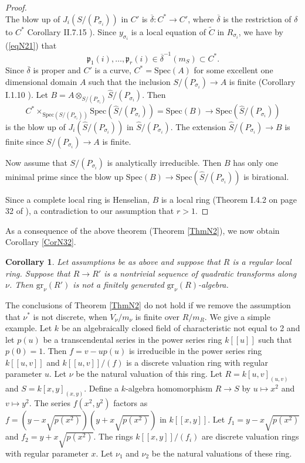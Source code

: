 \documentclass[11pt]{amsart}
\newtheorem{Corollary}[Theorem]{Corollary}
\begin{document}
\begin{proof}
$$ $$
 The blow up of $J_i(S/(P_{\sigma_i}))$ in $C'$ is $\overline\delta:C^*\rightarrow C'$, where $\overline\delta$ is the restriction of $\delta$ to $C^*$  Corollary II.7.15 \cite{H}). Since $y_{\sigma_i}$ is a local equation of $\tilde C$ in $R_{\sigma_i}$, we have by (\ref{eqN21})  that 
 $$
 \mathfrak p_1(i),\ldots,\mathfrak p_r(i)\in \overline\delta^{-1}(m_S)\subset C^*.
 $$
 Since $\overline\delta$ is proper and $C'$ is a curve, $C^*=\mbox{Spec}(A)$ for some excellent one dimensional  domain $A$ such that the inclusion $S/(P_{\sigma_i})\rightarrow A$ is finite (Corollary I.1.10 \cite{Mi}).
 Let $B=A\otimes_{S/(P_{\sigma_i})}\hat S/(P_{\sigma_i})$. Then
 $$
 C^*\times_{\mbox{Spec}(S/(P_{\sigma_i}))}\mbox{Spec}(\hat S/(P_{\sigma_i}))=\mbox{Spec}(B)\rightarrow \mbox{Spec}(\hat S/(P_{\sigma_i}))
 $$
 is the blow up of $J_i(\hat S/(P_{\sigma_i}))$ in $\hat S/(P_{\sigma_i})$.  The extension $\hat S/(P_{\sigma_i})\rightarrow B$ is finite since  $S/(P_{\sigma_i})\rightarrow A$ is finite.

Now assume that $S/(P_{\sigma_i})$ is analytically irreducible. Then $B$ has only one minimal prime since the blow up $\mbox{Spec}(B)\rightarrow \mbox{Spec}(\hat S/(P_{\sigma_i}))$ is birational. 
 
 Since a complete local ring is Henselian, $B$ is a local ring (Theorem I.4.2 on page 32 of \cite{Mi}), a contradiction to our assumption that $r>1$.
 \end{proof}
 
 As a consequence of the above theorem (Theorem \ref{ThmN2}), we now obtain Corollary \ref{CorN32}.
 
 \begin{Corollary} Let assumptions be as above and suppose that $R$ is a regular local ring. Suppose that $R\rightarrow R'$ is a nontrivial sequence of quadratic transforms along $\nu$. Then
 $\mbox{gr}_{\nu}(R')$ is not a finitely generated $\mbox{gr}_{\nu}(R)$-algebra.
 \end{Corollary}
 
 The conclusions of Theorem \ref{ThmN2} do not hold if we remove the assumption that $\nu^*$ is not discrete,  when $V_{\nu}/m_{\nu}$ is finite over  $R/m_R$. We give a  simple example. Let $k$ be an algebraically closed field of characteristic not equal to 2 and let $p(u)$ be a transcendental series in the power series ring $k[[u]]$ such that $p(0)=1$.  Then $f=v-up(u)$ is irreducible in the power series ring $k[[u,v]]$ and $k[[u,v]]/(f)$ is a discrete valuation ring with regular parameter $u$. Let $\nu$ be the natural valuation of this ring. 
 Let $R=k[u,v]_{(u,v)}$ and $S=k[x,y]_{(x,y)}$. Define a $k$-algebra homomorphism $R\rightarrow S$ by $u\mapsto x^2$ and $v\mapsto y^2$. The series
 $f(x^2,y^2)$ factors as $f=(y-x\sqrt{p(x^2)})(y+x\sqrt{p(x^2)})$ in $k[[x,y]]$. Let $f_1=y-x\sqrt{p(x^2)}$ and $f_2=y+x\sqrt{p(x^2)}$. The rings $k[[x,y]]/(f_i)$ are discrete valuation rings with regular parameter $x$. 
 Let $\nu_1$ and $\nu_2$ be the natural valuations of these ring. 
 
\end{document}
